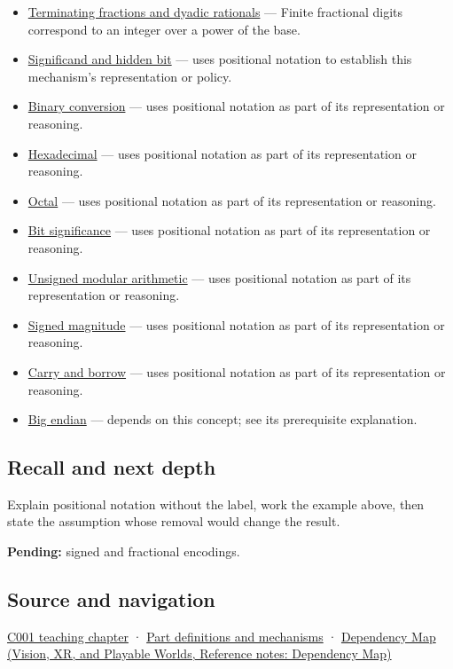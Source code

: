 \begin{itemize}
\item
  \hyperref[appendix-2a2f1b74bdd3]{Terminating fractions and dyadic rationals} --- Finite fractional digits correspond to an integer over a power of the base.
\item
  \hyperref[appendix-a24fd710cf67]{Significand and hidden bit} --- uses positional notation to establish this mechanism's representation or policy.
\item
  \hyperref[appendix-dc552784a2c0]{Binary conversion} --- uses positional notation as part of its representation or reasoning.
\item
  \hyperref[appendix-6b8075763724]{Hexadecimal} --- uses positional notation as part of its representation or reasoning.
\item
  \hyperref[appendix-17fc1bc8b305]{Octal} --- uses positional notation as part of its representation or reasoning.
\item
  \hyperref[appendix-280445746493]{Bit significance} --- uses positional notation as part of its representation or reasoning.
\item
  \hyperref[appendix-c99977d88b33]{Unsigned modular arithmetic} --- uses positional notation as part of its representation or reasoning.
\item
  \hyperref[appendix-ce20506c8532]{Signed magnitude} --- uses positional notation as part of its representation or reasoning.
\item
  \hyperref[appendix-d52d5f78ffd1]{Carry and borrow} --- uses positional notation as part of its representation or reasoning.
\item
  \hyperref[appendix-92e040df969a]{Big endian} --- depends on this concept; see its prerequisite explanation.
\end{itemize}

\subsection{Recall and next depth}\label{appendix-83c3f28f7bda-recall-and-next-depth}

Explain positional notation without the label, work the example above, then state the assumption whose removal would change the result.

\textbf{Pending:} signed and fractional encodings.

\subsection{Source and navigation}\label{appendix-83c3f28f7bda-source-and-navigation}

\hyperref[01-foundations-i-ch001-from-a-signal-to-an-interpretation]{C001 teaching chapter} · \hyperref[appendix-fd090d982a15]{Part definitions and mechanisms} · \href{../07-Vision-XR-and-Playable-Worlds/main.pdf\#nameddest=appendix-4ad47bdd269a}{Dependency Map (Vision, XR, and Playable Worlds, Reference notes: Dependency Map)}
